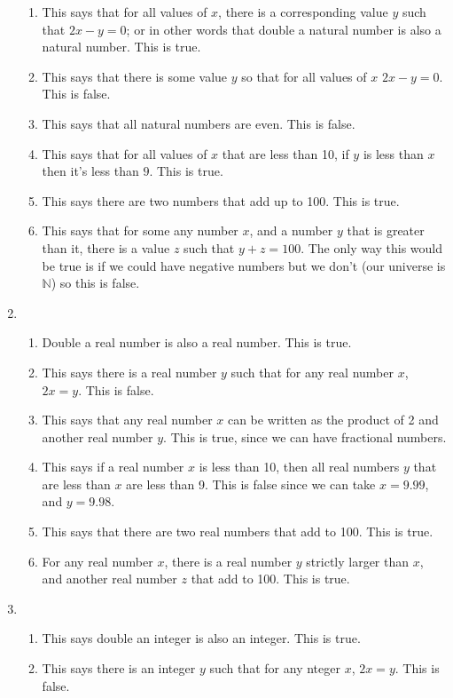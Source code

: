 \documentclass{article}
\begin{document}
\begin{enumerate}
\begin{enumerate}
  \item This says that for all values of $x$, there is a corresponding value $y$ such that $2x - y = 0$; or in other words that double a natural number is also a natural number. This is true.
  \item This says that there is some value $y$ so that for all values of $x$ $2x - y = 0$. This is false.
  \item This says that all natural numbers are even. This is false.
  \item This says that for all values of $x$ that are less than 10, if $y$ is less than $x$ then it's less than $9$.  This is true.
  \item This says there are two numbers that add up to 100. This is true.
  \item This says that for some any number $x$, and a number $y$ that is greater than it, there is a value $z$ such that $y + z = 100$. The only way this would be true is if we could have negative numbers but we don't (our universe is $\mathbb{N}$) so this is false.
  \end{enumerate}
\item
  \begin{enumerate}
  \item Double a real number is also a real number.  This is true.
  \item This says there is a real number $y$ such that for any real number $x$, $2x = y$.  This is false.
  \item This says that any real number $x$ can be written as the product of 2 and another real number $y$.  This is true, since we can have fractional numbers.
  \item This says if a real number $x$ is less than 10, then all real numbers $y$ that are less than $x$ are less than 9.  This is false since we can take $x = 9.99$, and $y = 9.98$.
  \item This says that there are two real numbers that add to 100.  This is true.
  \item For any real number $x$, there is a real number $y$ strictly larger than $x$, and another real number $z$ that add to 100.  This is true.
  \end{enumerate}
\item
  \begin{enumerate}
  \item This says double an integer is also an integer.  This is true.
  \item This says there is an integer $y$ such that for any nteger $x$, $2x = y$.  This is false.

\end{enumerate}
\end{enumerate}
\end{document}
